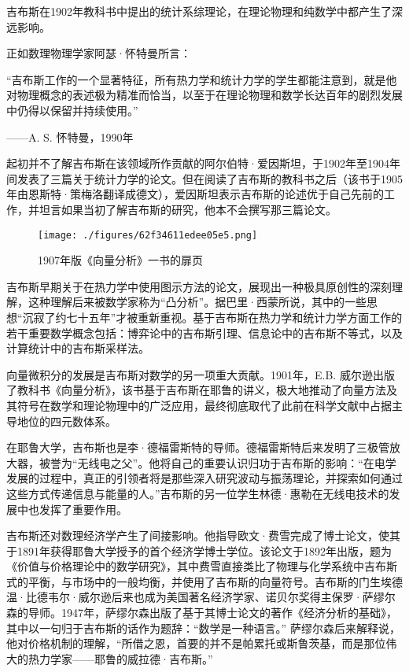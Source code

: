 吉布斯在1902年教科书中提出的统计系综理论，在理论物理和纯数学中都产生了深远影响。

正如数理物理学家阿瑟·怀特曼所言：

“吉布斯工作的一个显著特征，所有热力学和统计力学的学生都能注意到，就是他对物理概念的表述极为精准而恰当，以至于在理论物理和数学长达百年的剧烈发展中仍得以保留并持续使用。”

——A. S. 怀特曼，1990年

起初并不了解吉布斯在该领域所作贡献的阿尔伯特·爱因斯坦，于1902年至1904年间发表了三篇关于统计力学的论文。但在阅读了吉布斯的教科书之后（该书于1905年由恩斯特·策梅洛翻译成德文），爱因斯坦表示吉布斯的论述优于自己先前的工作，并坦言如果当初了解吉布斯的研究，他本不会撰写那三篇论文。
\begin{figure}[ht]
\centering
\texttt{[image: ./figures/62f34611edee05e5.png]}
\caption{1907年版《向量分析》一书的扉页} \label{fig_QSY_12}
\end{figure}
吉布斯早期关于在热力学中使用图示方法的论文，展现出一种极具原创性的深刻理解，这种理解后来被数学家称为“凸分析”。据巴里·西蒙所说，其中的一些思想“沉寂了约七十五年”才被重新重视。基于吉布斯在热力学和统计力学方面工作的若干重要数学概念包括：博弈论中的吉布斯引理、信息论中的吉布斯不等式，以及计算统计中的吉布斯采样法。

向量微积分的发展是吉布斯对数学的另一项重大贡献。1901年，E.B. 威尔逊出版了教科书《向量分析》，该书基于吉布斯在耶鲁的讲义，极大地推动了向量方法及其符号在数学和理论物理中的广泛应用，最终彻底取代了此前在科学文献中占据主导地位的四元数体系。

在耶鲁大学，吉布斯也是李·德福雷斯特的导师。德福雷斯特后来发明了三极管放大器，被誉为“无线电之父”。他将自己的重要认识归功于吉布斯的影响：“在电学发展的过程中，真正的引领者将是那些深入研究波动与振荡理论，并探索如何通过这些方式传递信息与能量的人。”吉布斯的另一位学生林德·惠勒在无线电技术的发展中也发挥了重要作用。

吉布斯还对数理经济学产生了间接影响。他指导欧文·费雪完成了博士论文，使其于1891年获得耶鲁大学授予的首个经济学博士学位。该论文于1892年出版，题为《价值与价格理论中的数学研究》，其中费雪直接类比了物理与化学系统中吉布斯式的平衡，与市场中的一般均衡，并使用了吉布斯的向量符号。吉布斯的门生埃德温·比德韦尔·威尔逊后来也成为美国著名经济学家、诺贝尔奖得主保罗·萨缪尔森的导师。1947年，萨缪尔森出版了基于其博士论文的著作《经济分析的基础》，其中以一句归于吉布斯的话作为题辞：“数学是一种语言。” 萨缪尔森后来解释说，他对价格机制的理解，“所借之恩，首要的并不是帕累托或斯鲁茨基，而是那位伟大的热力学家——耶鲁的威拉德·吉布斯。”

